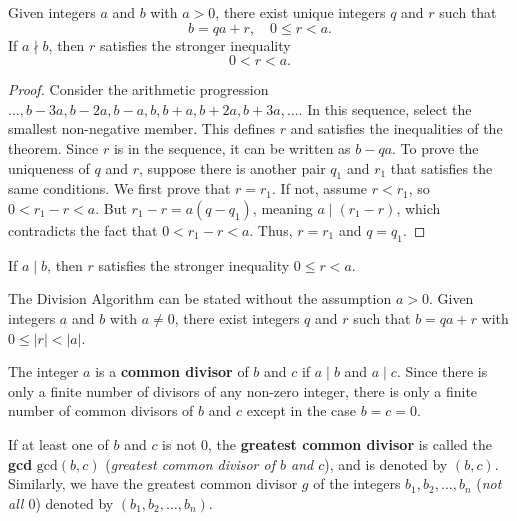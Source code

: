 \documentclass[11pt]{article}
\begin{document}
\begin{theorem}
    Given integers \(a\) and \(b\) with \(a > 0\), there exist unique integers \(q\) and \(r\) such that
    \[
        b = qa + r, \quad 0 \leq r < a.
    \]
    If \(a \nmid b\), then \(r\) satisfies the stronger inequality
    \[
        0 < r < a.
    \]
\end{theorem}

\begin{proof}
    Consider the arithmetic progression $\ldots, b - 3a, b - 2a, b - a, b, b + a, b + 2a, b + 3a, \ldots$. In this sequence, select the smallest non-negative member. This defines $r$ and satisfies the inequalities of the theorem. Since $r$ is in the sequence, it can be written as $b - qa$. To prove the uniqueness of $q$ and $r$, suppose there is another pair $q_1$ and $r_1$ that satisfies the same conditions. We first prove that $r = r_1$. If not, assume $r < r_1$, so $0 < r_1 - r < a$. But $r_1 - r = a(q - q_1)$, meaning $a \mid (r_1 - r)$, which contradicts the fact that $0 < r_1 - r < a$. Thus, $r = r_1$ and $q = q_1$.
\end{proof}

\begin{fact}
    If $a \mid b$, then $r$ satisfies the stronger inequality $0 \leq r < a$.
\end{fact}

\begin{fact}
    The Division Algorithm can be stated without the assumption $a > 0$. Given integers $a$ and $b$ with $a \neq 0$, there exist integers $q$ and $r$ such that $b = qa + r$ with $0 \leq |r| < |a|$.
\end{fact}

\begin{definition}
    The integer $a$ is a \textbf{common divisor} of $b$ and $c$ if $a \mid b$ and $a \mid c$. Since there is only a finite number of divisors of any non-zero integer, there is only a finite number of common divisors of $b$ and $c$ except in the case $b = c = 0$.
\end{definition}

If at least one of \( b \) and \( c \) is not \( 0 \), the \textbf{greatest
    common divisor} is called the \textbf{gcd} \( \text{gcd}(b, c) \)
(\textit{greatest common divisor of \( b \) and \( c \)}), and is denoted by \(
(b, c) \). Similarly, we have the greatest common divisor \( g \) of the
integers \( b_1, b_2, \ldots, b_n \) (\textit{not all \( 0 \)}) denoted by \(
(b_1, b_2, \ldots, b_n) \).
\end{document}
